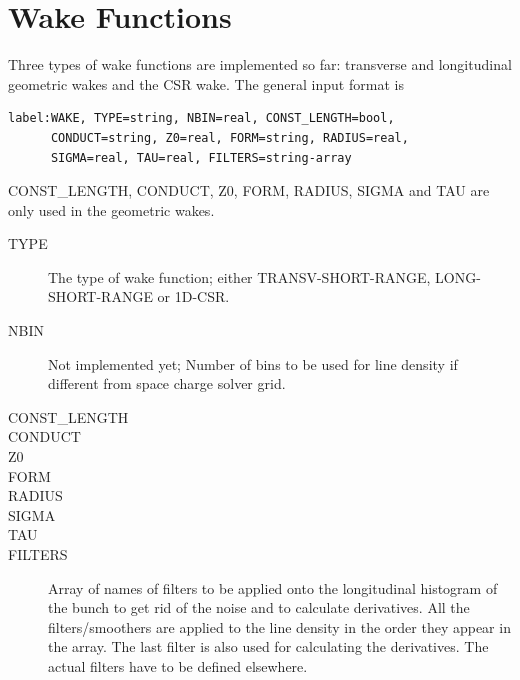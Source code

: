\section{Wake Functions}
Three types of wake functions are implemented so far: transverse and longitudinal geometric wakes and the CSR wake. The general input format is
\begin{verbatim}
label:WAKE, TYPE=string, NBIN=real, CONST_LENGTH=bool,
      CONDUCT=string, Z0=real, FORM=string, RADIUS=real,
      SIGMA=real, TAU=real, FILTERS=string-array
\end{verbatim}
CONST\_LENGTH, CONDUCT, Z0, FORM, RADIUS, SIGMA and TAU are only used in the geometric wakes.
\begin{description}
\item[TYPE]
  The type of wake function; either TRANSV-SHORT-RANGE, LONG-SHORT-RANGE or 1D-CSR.
\item[NBIN]
  Not implemented yet; Number of bins to be used for line density if different from space charge solver grid.
\item[CONST\_LENGTH]
  
\item[CONDUCT]

\item[Z0]

\item[FORM]

\item[RADIUS]

\item[SIGMA]

\item[TAU]

\item[FILTERS]
  Array of names of filters to be applied onto the longitudinal histogram of the bunch to get rid of the noise and to calculate derivatives. All the filters/smoothers are applied to the line density in the order they appear in the array. The last filter is also used for calculating the derivatives. The actual filters have to be defined elsewhere.
\end{description}

